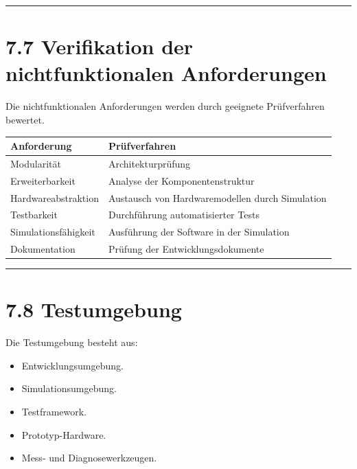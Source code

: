 \documentclass[
  a4paper,
  12pt,
  DIV=12,        %
  parskip=half,  %
  headings=small %
]{scrartcl}
\theoremstyle{definition}
\providecommand{\tightlist}{%
  \setlength{\itemsep}{0pt}\setlength{\parskip}{0pt}}
\theoremstyle{definition}
\providecommand{\tightlist}{%
  \setlength{\itemsep}{0pt}\setlength{\parskip}{0pt}}
\begin{document}
\begin{center}\rule{0.5\linewidth}{0.5pt}\end{center}

\section{7.7 Verifikation der nichtfunktionalen
Anforderungen}\label{verifikation-der-nichtfunktionalen-anforderungen}

Die nichtfunktionalen Anforderungen werden durch geeignete Prüfverfahren
bewertet.

\begin{longtable}[]{@{}
  >{\raggedright\arraybackslash}p{}
  >{\raggedright\arraybackslash}p{}@{}}
\toprule\noalign{}
\begin{minipage}[b]{\linewidth}\raggedright
Anforderung
\end{minipage} & \begin{minipage}[b]{\linewidth}\raggedright
Prüfverfahren
\end{minipage} \\
\midrule\noalign{}
\endhead
\bottomrule\noalign{}
\endlastfoot
Modularität & Architekturprüfung \\
Erweiterbarkeit & Analyse der Komponentenstruktur \\
Hardwareabstraktion & Austausch von Hardwaremodellen durch Simulation \\
Testbarkeit & Durchführung automatisierter Tests \\
Simulationsfähigkeit & Ausführung der Software in der Simulation \\
Dokumentation & Prüfung der Entwicklungsdokumente \\
\end{longtable}

\begin{center}\rule{0.5\linewidth}{0.5pt}\end{center}

\section{7.8 Testumgebung}\label{testumgebung}

Die Testumgebung besteht aus:

\begin{itemize}
\tightlist
\item
  Entwicklungsumgebung.
\item
  Simulationsumgebung.
\item
  Testframework.
\item
  Prototyp-Hardware.
\item
  Mess- und Diagnosewerkzeugen.
\end{itemize}
\end{document}
